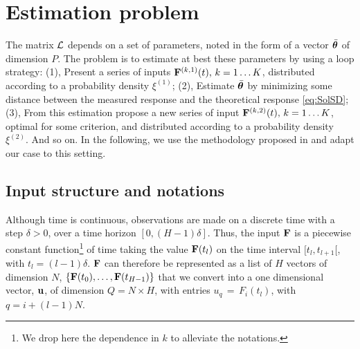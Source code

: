 \documentclass{article}
\newcommand{\B}[1]{{\textcolor{blue}{[Bruno: \textit{#1}]}}}
\newcommand{\TBC}{\bigskip \B{To be continued} \pagebreak}
\begin{document}


\section{Estimation problem}

The matrix ${\mathcal L}$ depends on a set of parameters, noted in the form of a vector $\bar{\boldsymbol{\theta}}$ of dimension $P$. The problem is to estimate at best these parameters by using a loop strategy: (1), Present a series of inputs $\bold{F}^{(k,1)}(t), \, k=1 \dots K$, distributed according to a probability density $\xi^{(1)}$;
(2), Estimate $\bar{\boldsymbol{\theta}}$ by minimizing some distance between the measured response and the theoretical response \eqref{eq:SolSD}; (3), From this estimation propose a new series of input $\bold{F}^{(k,2)}(t), \, k=1 \dots K$, optimal for some criterion, and distributed according to a probability density $\xi^{(2)}$. And so on. 
In the following, we use the methodology proposed in \cite{pronzato:08} and adapt our case to this setting.

\subsection{Input structure and notations}\label{eq:InputStructure}

Although time is continuous, observations are made on a discrete time with a step $\delta>0$, over a time horizon $[0,(H-1)\delta]$. Thus, the input $\bold{F}$ is a piecewise constant function\footnote{We drop here the dependence in $k$ to alleviate the notations.} of time taking the value $\bold{F}(t_l)$ on the time interval $[t_l, t_{l+1}[$, with $t_l=(l-1)\delta$. $\bold{F}$ can therefore be represented as a list of $H$ vectors of dimension $N$, $\left\{\bold{F}(t_0), \dots, \bold{F}(t_{H-1})\right\}$ that we convert into a  one dimensional vector, $\bold{u}$, of dimension $Q=N \times H$, with entries $u_q\,=\,F_i(t_l)$, with $q=i+(l-1)N$. 
\end{document}
